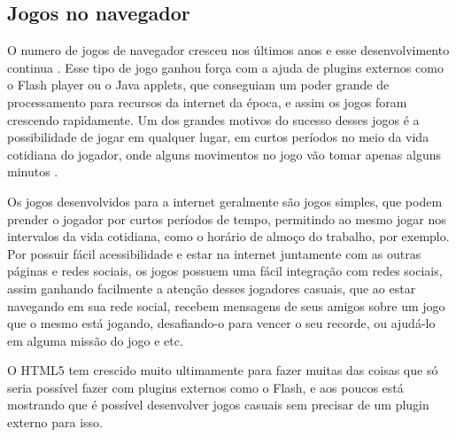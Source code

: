 \subsection{Jogos no navegador}
O numero de jogos de navegador cresceu nos últimos anos e esse
desenvolvimento continua \cite{ozcan2010recent}. Esse tipo de jogo
ganhou força com a ajuda de plugins externos como o Flash player ou
o Java applets, que conseguiam um poder grande de processamento para
recursos da internet da época, e assim os jogos foram crescendo rapidamente.
Um dos grandes motivos do sucesso desses jogos é a possibilidade de
jogar em qualquer lugar, em curtos períodos no meio da vida cotidiana
do jogador, onde alguns movimentos no jogo vão tomar apenas alguns
minutos \cite{ozcan2010recent}.

Os jogos desenvolvidos para a internet geralmente são jogos simples,
que podem prender o jogador por curtos períodos de tempo, permitindo
ao mesmo jogar nos intervalos da vida cotidiana, como o horário de almoço
do trabalho, por exemplo.
Por possuir fácil acessibilidade e estar na internet juntamente com as
outras páginas e redes sociais, os jogos possuem uma fácil integração
com redes sociais, assim ganhando facilmente a atenção desses
jogadores casuais, que ao estar navegando em sua rede social, recebem
mensagens de seus amigos sobre um jogo que o mesmo está jogando,
desafiando-o para vencer o seu recorde, ou ajudá-lo em alguma missão
do jogo e etc.

O HTML5 tem crescido muito ultimamente para fazer muitas das coisas
que só seria possível fazer com plugins externos como o Flash, e aos
poucos está mostrando que é possível desenvolver jogos casuais sem
precisar de um plugin externo para isso.
